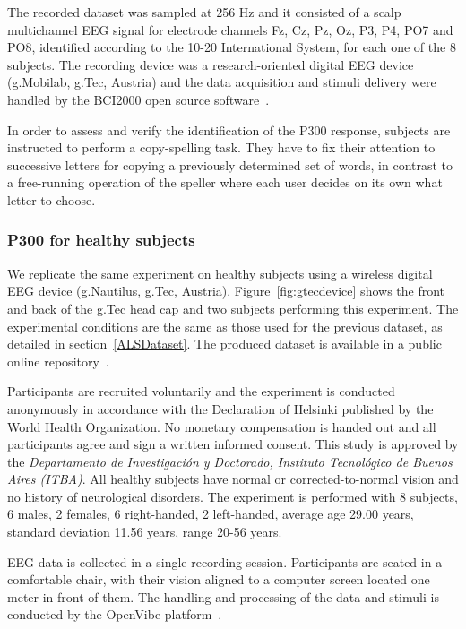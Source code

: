 The recorded dataset was sampled at 256 Hz and it consisted of a scalp multichannel EEG signal for electrode channels Fz, Cz, Pz, Oz, P3, P4, PO7 and PO8, identified according to the 10-20 International System,  for each one of the 8 subjects.   The recording device was a research-oriented digital EEG device (g.Mobilab, g.Tec, Austria) and the data acquisition and stimuli delivery were handled by the BCI2000 open source software~\cite{Schalk2004}.

In order to assess and verify the identification of the P300 response, subjects are instructed to perform a copy-spelling task. They have to fix their attention to successive letters for copying a previously determined set of words, in contrast to a free-running operation of the speller where each user decides on its own what letter to choose.

\subsubsection{P300 for healthy subjects}
\label{P300healthysubject}

We replicate the same experiment on healthy subjects using a wireless digital EEG device (g.Nautilus, g.Tec, Austria).  Figure~\ref{fig:gtecdevice} shows the front and back of the g.Tec head cap and two subjects performing this experiment.   The experimental conditions are the same as those used for the previous dataset, as detailed in section~\ref{ALSDataset}.  The produced dataset is available in a public online repository~\cite{owndataset}.

Participants are recruited voluntarily and the experiment is conducted anonymously in accordance with the Declaration of Helsinki published by the World Health Organization.  No monetary compensation is handed out and all participants agree and sign a written informed consent.  This study is approved by the \textit{Departamento de Investigación y Doctorado, Instituto Tecnológico de Buenos Aires (ITBA)}.  All healthy subjects have normal or corrected-to-normal vision and no history of neurological disorders. The experiment is performed with 8 subjects, 6 males, 2 females, 6 right-handed, 2 left-handed, average age 29.00 years, standard deviation  11.56 years, range 20-56 years.

EEG data is collected in a single recording session. Participants are seated in a comfortable chair, with their vision aligned to a computer screen located one meter in front of them.  The handling and processing of the data and stimuli is conducted by the OpenVibe platform~\cite{Renard2010}. 

